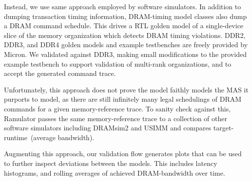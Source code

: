 Instead, we use same approach employed by software simulators. In
addition to dumping transaction timing information, DRAM-timing model classes
also dump a DRAM command schedule. This drives a RTL golden model of a
single-device slice of the memory organization which detects DRAM timing
violations. DDR2, DDR3, and DDR4 golden models and example testbenches are
freely provided by Micron\cite{microngolden}. We validated against DDR3, making small
modifications to the provided example testbench to support validation of
multi-rank organizations, and to accept the generated command trace.

Unfortunately, this approach does not prove the model faithly models the MAS it
purports to model, as there are still infinitely many legal schedulings of DRAM
commands for a given memory-reference trace. To sanity check against this,
Ramulator passes the same memory-reference trace to a collection of other
software simulators including DRAMsim2 and USIMM and compares
target-runtime~(average bandwidth).

Augmenting this approach, our validation flow generates plots that can be used
to further inspect deviations between the models. This includes latency
histograms, and rolling averages of achieved DRAM-bandwidth over time.
